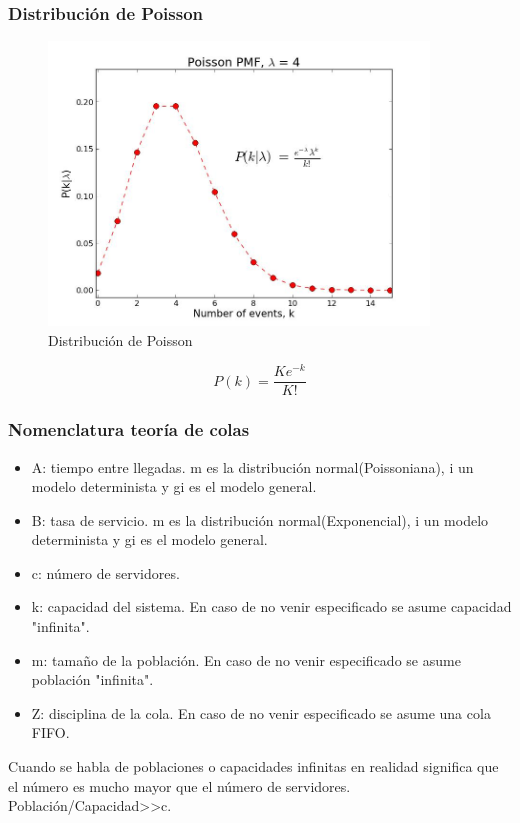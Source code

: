 \subsubsection{Distribución de Poisson}
\begin{figure}[H]
\centering
\includegraphics[width=0.9\textwidth]{Imagen/distribucionpoisson.jpg}
\caption{Distribución de Poisson}
\label{}
\end{figure}
\begin{equation}
P(k)=\frac{Ke^{-k}}{K!}
\end{equation}
\subsubsection{Nomenclatura teoría de colas}
\begin{center}
 \par
\end{center}
\begin{itemize}
\item {A:} tiempo entre llegadas. m es la distribución normal(Poissoniana), i un modelo determinista y gi es el modelo general.
\item {B:} tasa de servicio. m es la distribución normal(Exponencial), i un modelo determinista y gi es el modelo general.
\item {c:} número de servidores.
\item {k:} capacidad del sistema. En caso de no venir especificado se asume capacidad "infinita".
\item {m:} tamaño de la población. En caso de no venir especificado se asume población "infinita".
\item {Z:} disciplina de la cola. En caso de no venir especificado se asume una cola FIFO.
\end{itemize}
Cuando se habla de poblaciones o capacidades infinitas en realidad significa que el número es mucho mayor que el número de servidores. Población/Capacidad>>c.
